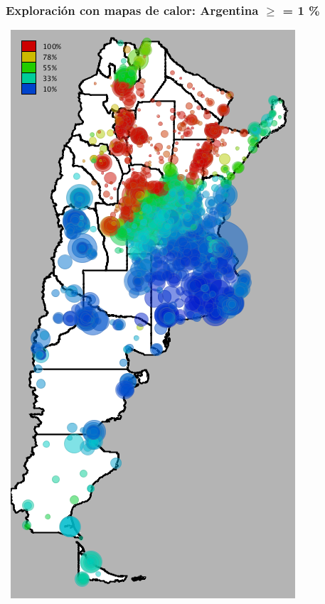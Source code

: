 \documentclass[xcolor=x11names]{beamer}
\begin{document}
\begin{frame}
	\frametitle{Exploración con mapas de calor: Argentina $\geq$ = 1 \%}
	\center\
	\includegraphics[height=.9\textheight,width = .9\columnwidth, keepaspectratio]
	{slides/201112_hi_res_argentina_usuarios_proporcion_circulos_beta1.png}
\end{frame}
\end{document}
